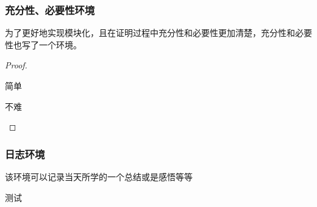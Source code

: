 \documentclass{xdyy-usermanual}
\begin{document}
\subsubsection{ 充分性、必要性环境  }

为了更好地实现模块化，且在证明过程中充分性和必要性更加清楚，充分性和必要性也写了一个环境。

\begin{vexample}
    \begin{proof}
      \begin{necessity}
        简单
      \end{necessity}
    
      \begin{sufficiency}
        不难
        \qedhere
      \end{sufficiency}
    \end{proof}
\end{vexample}



\subsubsection{ 日志环境  }

该环境可以记录当天所学的一个总结或是感悟等等

\begin{vexample}
    \begin{changelog}[date = {2022-02-24}]
      测试
    \end{changelog}
\end{vexample}
\end{document}
